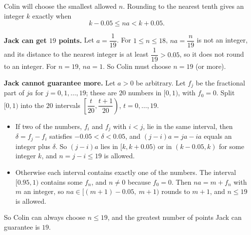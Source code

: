 Colin will choose the smallest allowed $n$. Rounding to the nearest tenth gives an integer $k$ exactly when
\[
k-0.05\le na<k+0.05 .
\]

\textbf{Jack can get $19$ points.} Let $a=\dfrac{1}{19}$. For $1\le n\le18$, $na=\dfrac {n}{19}$ is not an integer, and its distance to the nearest integer is at least $\dfrac{1}{19}>0.05$, so it does not round to an integer. For $n=19$, $na=1$. So Colin must choose $n=19$ (or more).

\textbf{Jack cannot guarantee more.} Let $a>0$ be arbitrary. Let $f_j$ be the fractional part of $ja$ for $j=0,1,\dots,19$; these are $20$ numbers in $[0,1)$, with $f_0=0$. Split $[0,1)$ into the $20$ intervals $\left[\dfrac{t}{20},\dfrac{t+1}{20}\right)$, $t=0,\dots,19$.
\begin{itemize}
\item If two of the numbers, $f_i$ and $f_j$ with $i<j$, lie in the same interval, then $\delta=f_j-f_i$ satisfies $-0.05<\delta<0.05$, and $(j-i)a=ja-ia$ equals an integer plus $\delta$. So $(j-i)a$ lies in $[k,k+0.05)$ or in $(k-0.05,k)$ for some integer $k$, and $n=j-i\le19$ is allowed.
\item Otherwise each interval contains exactly one of the numbers. The interval $[0.95,1)$ contains some $f_n$, and $n\ne0$ because $f_0=0$. Then $na=m+f_n$ with $m$ an integer, so $na\in[(m+1)-0.05,\ m+1)$ rounds to $m+1$, and $n\le19$ is allowed.
\end{itemize}
So Colin can always choose $n\le19$, and the greatest number of points Jack can guarantee is $\boxed{19}$.
